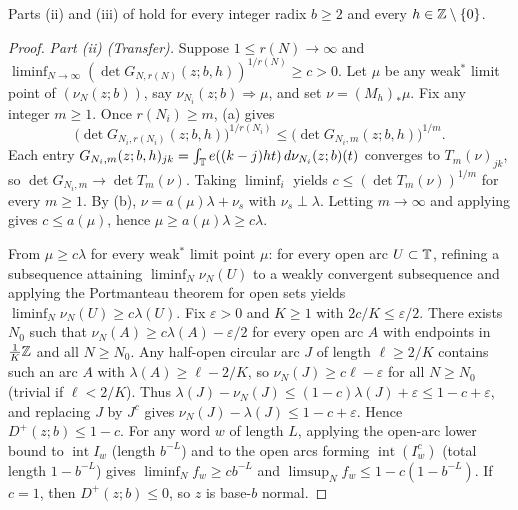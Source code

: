 \documentclass[11pt]{article}
\begin{document}
\begin{theorem}\label{thm:toeplitz-sharp}
Parts \textup{(ii)} and \textup{(iii)} of  hold for every integer radix $b\ge2$ and every $h\in\mathbb Z\setminus\{0\}$.
\end{theorem}

\begin{proof}
\emph{Part \textup{(ii)} (Transfer).} Suppose $1\le r(N)\to\infty$ and $\liminf_{N\to\infty}(\det G_{N,r(N)}(z;b,h))^{1/r(N)}\ge c>0$. Let $\mu$ be any weak$^*$ limit point of $(\nu_N(z;b))$, say $\nu_{N_i}(z;b)\Rightarrow\mu$, and set $\nu=(M_h)_*\mu$. Fix any integer $m\ge1$. Once $r(N_i)\ge m$, (a) gives
\[
\bigl(\det G_{N_i,r(N_i)}(z;b,h)\bigr)^{1/r(N_i)}\le\bigl(\det G_{N_i,m}(z;b,h)\bigr)^{1/m}.
\]
Each entry $G_{N_i,m}(z;b,h)_{jk}=\int_{\mathbb T}e((k-j)ht)\,d\nu_{N_i}(z;b)(t)$ converges to $T_m(\nu)_{jk}$, so $\det G_{N_i,m}\to\det T_m(\nu)$. Taking $\liminf_i$ yields $c\le(\det T_m(\nu))^{1/m}$ for every $m\ge1$. By (b), $\nu=a(\mu)\lambda+\nu_s$ with $\nu_s\perp\lambda$. Letting $m\to\infty$ and applying  gives $c\le a(\mu)$, hence $\mu\ge a(\mu)\lambda\ge c\lambda$.

From $\mu\ge c\lambda$ for every weak$^*$ limit point $\mu$: for every open arc $U\subset\mathbb T$, refining a subsequence attaining $\liminf_N\nu_N(U)$ to a weakly convergent subsequence and applying the Portmanteau theorem for open sets \cite{Billingsley99} yields $\liminf_N\nu_N(U)\ge c\lambda(U)$. Fix $\varepsilon>0$ and $K\ge1$ with $2c/K\le\varepsilon/2$. There exists $N_0$ such that $\nu_N(A)\ge c\lambda(A)-\varepsilon/2$ for every open arc $A$ with endpoints in $\frac1K\mathbb Z$ and all $N\ge N_0$. Any half-open circular arc $J$ of length $\ell\ge 2/K$ contains such an arc $A$ with $\lambda(A)\ge\ell-2/K$, so $\nu_N(J)\ge c\ell-\varepsilon$ for all $N\ge N_0$ (trivial if $\ell<2/K$). Thus $\lambda(J)-\nu_N(J)\le(1-c)\lambda(J)+\varepsilon\le 1-c+\varepsilon$, and replacing $J$ by $J^c$ gives $\nu_N(J)-\lambda(J)\le 1-c+\varepsilon$. Hence $D^+(z;b)\le 1-c$. For any word $w$ of length $L$, applying the open-arc lower bound to $\operatorname{int}I_w$ (length $b^{-L}$) and to the open arcs forming $\operatorname{int}(I_w^c)$ (total length $1-b^{-L}$) gives $\liminf_N f_w\ge cb^{-L}$ and $\limsup_N f_w\le 1-c(1-b^{-L})$. If $c=1$, then $D^+(z;b)\le0$, so $z$ is base-$b$ normal.


\end{proof}
\end{document}

